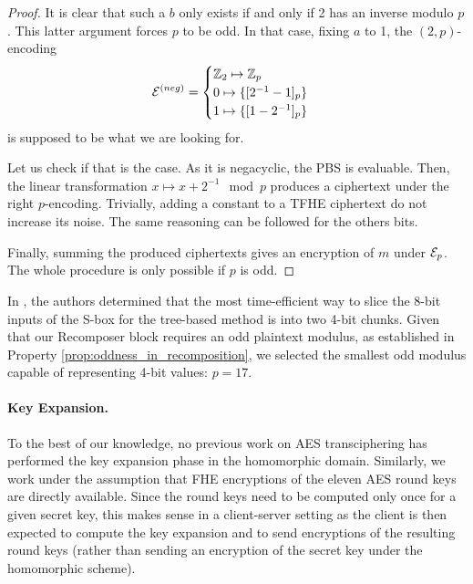 \begin{proof}
It is clear that such a $b$ only exists if and only if 2 has an inverse modulo $p$. This latter argument forces $p$ to be odd. In that case, fixing $a$ to 1, the $(2, p)$-encoding 
$$
\mathcal{E}^{(neg)} = \begin{cases} \mathbb{Z}_2 \mapsto \mathbb{Z}_{p} \\ 0 \mapsto \{[2^{-1} - 1]_p\} \\ 1 \mapsto \{[1 - 2^{-1}]_p\} \end{cases}
$$ 
is supposed to be what we are looking for.

Let us check if that is the case. As it is negacyclic, the \gls{PBS} is evaluable. Then, the linear transformation $x \mapsto x + 2^{-1} \mod p $ produces a ciphertext under the right $p$-encoding. Trivially, adding a constant to a \gls{TFHE} ciphertext do not increase its noise. The same reasoning can be followed for the others bits.

Finally, summing the produced ciphertexts gives an encryption of $m$ under $\mathcal{E}_p$. The whole procedure is only possible if $p$ is odd.
\end{proof}


In \cite{DBLP:conf/wahc/TramaCBS23}, the authors determined that the most time-efficient way to slice the 8-bit inputs of the S-box for the tree-based method is into two 4-bit chunks. Given that our Recomposer block requires an odd plaintext modulus, as established in Property \ref{prop:oddness_in_recomposition}, we selected the smallest odd modulus capable of representing 4-bit values: $p=17$. 

\paragraph{Key Expansion.} 
To the best of our knowledge, no previous work on \gls{AES} transciphering has performed the key expansion phase in the homomorphic domain. Similarly, we work under the assumption that \gls{FHE} encryptions of the eleven \gls{AES} round keys are directly available. Since the round keys need to be computed only once for a given secret key, this makes sense in a client-server setting as the client is then expected to compute the key expansion and to send encryptions of the resulting round keys (rather than sending an encryption of the secret key under the homomorphic scheme).



